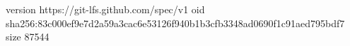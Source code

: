 version https://git-lfs.github.com/spec/v1
oid sha256:83c000ef9e7d2a59a3cac6e53126f940b1b3cfb3348ad0690f1c91aed795bdf7
size 87544
